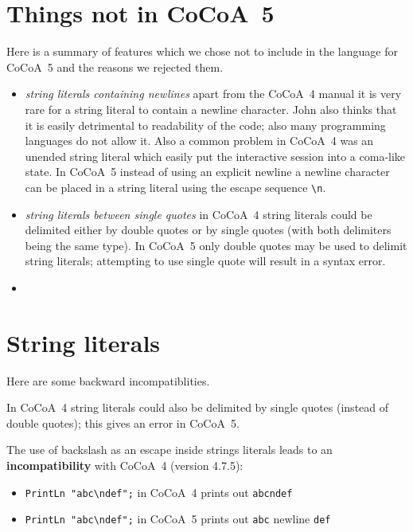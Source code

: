 \documentclass{book}[12,a4paper]
\begin{document}

\section{Things not in CoCoA~5}


Here is a summary of features which we chose not to include in the language
for CoCoA~5 and the reasons we rejected them.

\begin{itemize}
\item {\it string literals containing newlines} apart from the CoCoA~4
  manual it is very rare for a string literal to contain a newline
  character.  John also thinks that it is easily detrimental to readability
  of the code; also many programming languages do not allow it.  Also a
  common problem in CoCoA~4 was an unended string literal which easily put
  the interactive session into a coma-like state.  In CoCoA~5 instead of
  using an explicit newline a newline character can be placed in a string
  literal using the escape sequence \verb|\n|.
\item  {\it string literals between single quotes} in CoCoA~4 string
  literals could be delimited either by double quotes or by single quotes
  (with both delimiters being the same type).  In CoCoA~5 only double
  quotes may be used to delimit string literals; attempting to use single
  quote will result in a syntax error.
\item 
\end{itemize}

\section{String literals}
\label{diffs:StringLiterals}

Here are some backward incompatiblities.

In CoCoA~4 string literals could also be delimited by single quotes
(instead of double quotes); this gives an error in CoCoA~5.

The use of backslash as an escape inside strings literals leads to an
{\bf incompatibility} with CoCoA~4 (version 4.7.5):
\begin{itemize}
\item \verb|PrintLn "abc\ndef";| in CoCoA~4 prints out \verb|abcndef|
\item \verb|PrintLn "abc\ndef";| in CoCoA~5 prints out \verb|abc| newline \verb|def|
\end{itemize}
\end{document}

